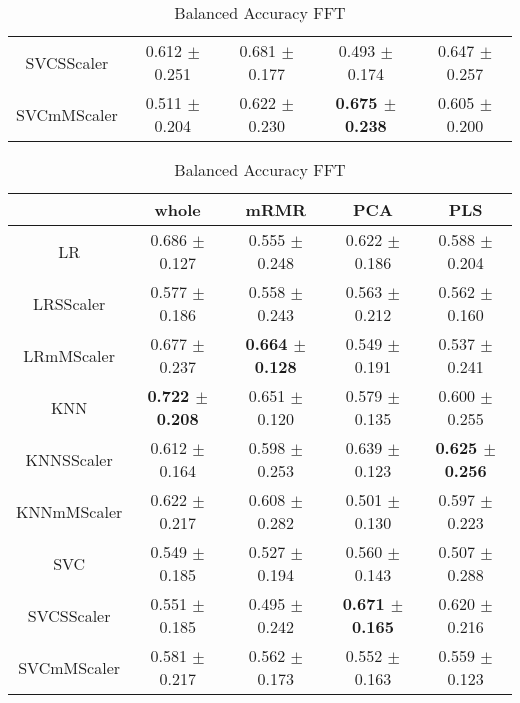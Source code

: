 \documentclass[]{report}
\begin{document}
\begin{table}
\begin{tabular}{c|cccc}
			 SVCSScaler  & 0.612 $\pm$ 0.251 & 0.681 $\pm$ 0.177 & 0.493 $\pm$ 0.174 & 0.647 $\pm$ 0.257 \\
			 SVCmMScaler & 0.511 $\pm$ 0.204 & 0.622 $\pm$ 0.230 & \textbf{0.675 $\pm$ 0.238} & 0.605 $\pm$ 0.200 \\
			\hline
		\end{tabular}
		\caption{\label{tab:bal_acc_DCOR} Balanced Accuracy DCOR}
		\vspace*{2cm}
		\begin{tabular}{c|cccc}
			\hline
			             & whole           & mRMR            & PCA             & PLS             \\
			\hline
			 LR          & 0.686 $\pm$ 0.127 & 0.555 $\pm$ 0.248 & 0.622 $\pm$ 0.186 & 0.588 $\pm$ 0.204 \\
			 LRSScaler   & 0.577 $\pm$ 0.186 & 0.558 $\pm$ 0.243 & 0.563 $\pm$ 0.212 & 0.562 $\pm$ 0.160 \\
			 LRmMScaler  & 0.677 $\pm$ 0.237 & \textbf{0.664 $\pm$ 0.128} & 0.549 $\pm$ 0.191 & 0.537 $\pm$ 0.241 \\
			 KNN         & \textbf{0.722 $\pm$ 0.208} & 0.651 $\pm$ 0.120 & 0.579 $\pm$ 0.135 & 0.600 $\pm$ 0.255 \\
			 KNNSScaler  & 0.612 $\pm$ 0.164 & 0.598 $\pm$ 0.253 & 0.639 $\pm$ 0.123 & \textbf{0.625 $\pm$ 0.256} \\
			 KNNmMScaler & 0.622 $\pm$ 0.217 & 0.608 $\pm$ 0.282 & 0.501 $\pm$ 0.130 & 0.597 $\pm$ 0.223 \\
			 SVC         & 0.549 $\pm$ 0.185 & 0.527 $\pm$ 0.194 & 0.560 $\pm$ 0.143 & 0.507 $\pm$ 0.288 \\
			 SVCSScaler  & 0.551 $\pm$ 0.185 & 0.495 $\pm$ 0.242 & \textbf{0.671 $\pm$ 0.165} & 0.620 $\pm$ 0.216 \\
			 SVCmMScaler & 0.581 $\pm$ 0.217 & 0.562 $\pm$ 0.173 & 0.552 $\pm$ 0.163 & 0.559 $\pm$ 0.123 \\
			\hline
		\end{tabular}
		\caption{\label{tab:bal_acc_FFT} Balanced Accuracy FFT}
		\vspace*{2cm}
	\end{table}
\end{document}
